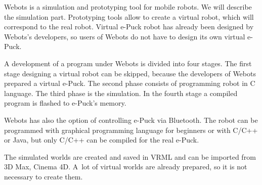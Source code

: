   Webots is a simulation and prototyping tool for mobile robots.
  We will describe the simulation part.  Prototyping tools allow to create a virtual robot,
  which will correspond to the real robot.
  Virtual e-Puck robot has already been designed
  by Webots's developers, so users of Webots do not have to design its own virtual e-Puck.
  
  A development of a program under Webots is divided into four stages. 
  The first stage designing a virtual robot can be skipped,
  because the developers of Webots prepared a virtual e-Puck.
  The second phase consists of programming robot in C language. 
  The third phase is the simulation. 
  In the fourth stage a compiled program is flashed to e-Puck's memory.
  
  Webots has also the option of controlling e-Puck via Bluetooth.
  The robot can be programmed with graphical programming language 
  for beginners or with C/C++ or Java,
  but only C/C++ can be compiled for the real e-Puck.

  The simulated worlds are created and saved in VRML and can be imported 
  from 3D Max, Cinema 4D.
  A~lot of virtual worlds are already prepared, so it is not necessary to create them.
  

  \clearpage

